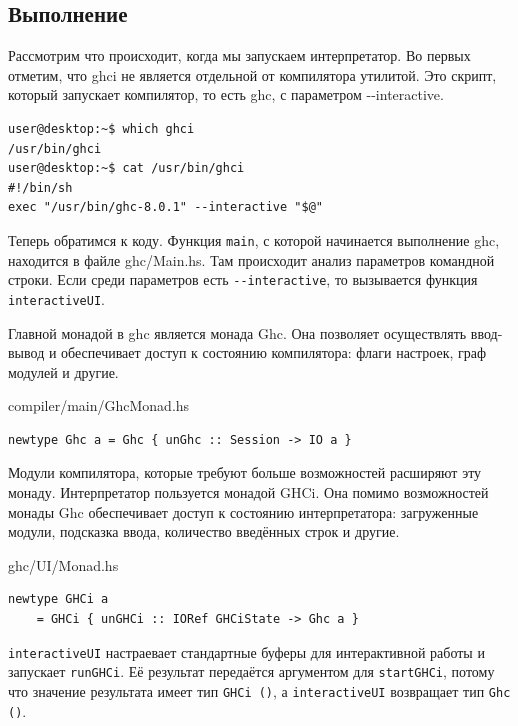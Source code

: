 \documentclass[fontsize=14pt, paper=a4, pagesize, DIV=calc]{scrartcl}
\def\code#1{\texttt{#1}}
\begin{document}
\subsection{Выполнение}

Рассмотрим что происходит, когда мы запускаем интерпретатор. Во первых отметим,
что ghci не является отдельной от компилятора утилитой. Это скрипт, который
запускает компилятор, то есть ghc, с параметром -{}-interactive.

\begin{ListingEnv}
\caption{}
\begin{lstlisting}[numbers=none]
user@desktop:~$ which ghci
/usr/bin/ghci
user@desktop:~$ cat /usr/bin/ghci
#!/bin/sh
exec "/usr/bin/ghc-8.0.1" --interactive "$@"
\end{lstlisting}
\end{ListingEnv}

Теперь обратимся к коду. Функция \code{main}, с которой начинается выполнение
ghc, находится в файле ghc/Main.hs. Там происходит анализ параметров командной
строки. Если среди параметров есть \code{-{}-interactive}, то вызывается
функция \code{interactiveUI}. 

Главной монадой в ghc является монада Ghc. Она позволяет осуществлять
ввод-вывод и обеспечивает доступ к состоянию компилятора: флаги настроек, граф
модулей и другие. 

\begin{ListingEnv}
\caption{compiler/main/GhcMonad.hs}
\begin{lstlisting}[numbers=none]
newtype Ghc a = Ghc { unGhc :: Session -> IO a }
\end{lstlisting}
\end{ListingEnv}

Модули компилятора, которые требуют больше возможностей расширяют эту монаду.
Интерпретатор пользуется монадой GHCi. Она помимо возможностей монады Ghc
обеспечивает доступ к состоянию интерпретатора: загруженные модули, подсказка
ввода, количество введённых строк и другие.

\begin{ListingEnv}
\caption{ghc/UI/Monad.hs}
\begin{lstlisting}[numbers=none]
newtype GHCi a 
    = GHCi { unGHCi :: IORef GHCiState -> Ghc a }
\end{lstlisting}
\end{ListingEnv}

\code{interactiveUI} настраевает стандартные буферы для интерактивной работы и
запускает \code{runGHCi}. Её результат передаётся аргументом для
\code{startGHCi}, потому что значение результата имеет тип \code{GHCi ()}, а
\code{interactiveUI} возвращает тип \code{Ghc ()}.
\end{document}
